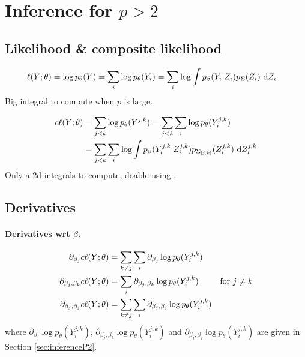 \section{Inference for $p > 2$}  \label{sec:inferenceP3}

\subsection{Likelihood \& composite likelihood}

\begin{align*}
 \ell(Y; \theta) & = \log p_\theta(Y) = \sum_i \log p_\theta(Y_i) 
 = \sum_i \log \int p_\beta(Y_i|Z_i) p_\Sigma(Z_i) \d Z_i
\end{align*}
Big integral to compute when $p$ is large.

\begin{align*}
 \cl(Y; \theta) 
 & = \sum_{j<k} \log p_\theta(Y^{j, k}) = \sum_{j<k} \sum_i \log p_\theta(Y_i^{j, k}) \\
 & = \sum_{j<k} \sum_i \log \int p_\beta(Y_i^{j, k}|Z_i^{j, k}) p_{\Sigma_{[j, k]}}(Z_i^{j, k}) \d Z_i^{j, k} 
\end{align*}
Only a 2d-integrals to compute, doable using \cite{GrE08}.

\subsection{Derivatives}

\paragraph{Derivatives wrt $\beta$.}
\begin{align*}
 \partial_{\beta_j} c\ell(Y; \theta) 
 & = \sum_{k \neq j} \sum_i \partial_{\beta_j} \log p_\theta(Y_i^{j, k}) \\
 \partial_{\beta_j, \beta_k} c\ell(Y; \theta) 
 & = \sum_i \partial_{\beta_j, \beta_k} \log p_\theta(Y_i^{j, k})
 & \text{for } j \neq k \\
 \partial_{\beta_j, \beta_j} c\ell(Y; \theta) 
 & = \sum_{k \neq j} \sum_i \partial_{\beta_j, \beta_j} \log p_\theta(Y_i^{j, k})
\end{align*}
where $\partial_{\beta_j} \log p_\theta(Y_i^{j, k})$, $\partial_{\beta_j, \beta_k} \log p_\theta(Y_i^{j, k})$ and $\partial_{\beta_j, \beta_j} \log p_\theta(Y_i^{j, k})$ are given in Section \ref{sec:inferenceP2}.

